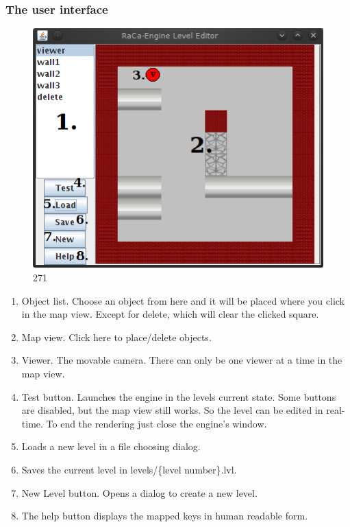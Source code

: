 \documentclass[a4paper,10pt]{article}
\begin{document}
\subsubsection{The user interface}

\begin{figure}[h]
 \centering
 \includegraphics{leveleditor_screenshot.png}
271
\end{figure}

\begin{enumerate}
 \item Object list. Choose an object from here and it will be placed where
you click in the map view. Except for delete, which will clear the clicked
square.
\item Map view. Click here to place/delete objects.
\item Viewer. The movable camera. There can only be one viewer at a time in the
map view.
\item Test button. Launches the engine in the levels current state. Some
buttons are disabled, but the map view still works. So the level can be edited
in real-time. To end the rendering just close the engine's window.
\item Loads a new level in a file choosing dialog.
\item Saves the current level in levels/\{level number\}.lvl.
\item New Level button. Opens a dialog to create a new level.
\item The help button displays the mapped keys in human readable form.
\end{enumerate}
\end{document}
